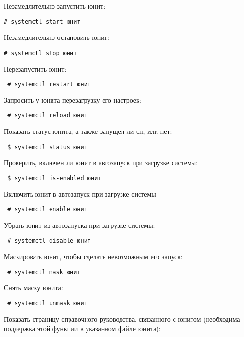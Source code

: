 \documentclass[a4paper,10pt,twoside]{article}
\begin{document}
Незамедлительно запустить юнит:

\begin{verbatim}
# systemctl start юнит
\end{verbatim} 
Незамедлительно остановить юнит:

\begin{verbatim}
# systemctl stop юнит
\end{verbatim} 
Перезапустить юнит:

\begin{verbatim}
 # systemctl restart юнит
\end{verbatim} 

Запросить у юнита перезагрузку его настроек:

\begin{verbatim}
 # systemctl reload юнит
\end{verbatim} 

Показать статус юнита, а также запущен ли он, или нет:

\begin{verbatim}
 $ systemctl status юнит
\end{verbatim} 
Проверить, включен ли юнит в автозапуск при загрузке системы:

\begin{verbatim}
 $ systemctl is-enabled юнит
\end{verbatim} 

Включить юнит в автозапуск при загрузке системы:

\begin{verbatim}
 # systemctl enable юнит
\end{verbatim} 
Убрать юнит из автозапуска при загрузке системы:

\begin{verbatim}
 # systemctl disable юнит
\end{verbatim} 

Маскировать юнит, чтобы сделать невозможным его запуск:

\begin{verbatim}
 # systemctl mask юнит
\end{verbatim}  

Снять маску юнита:

\begin{verbatim}
 # systemctl unmask юнит
\end{verbatim}

Показать страницу справочного руководства, связанного с юнитом (необходима поддержка этой функции в указанном файле юнита):
\end{document}
